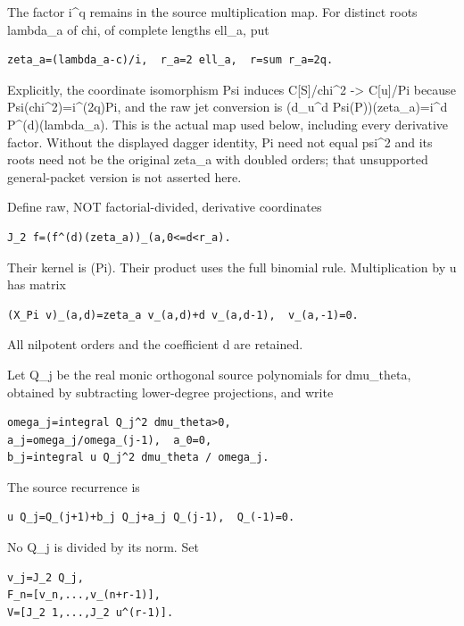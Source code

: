 The factor i\^{}q remains in the source multiplication map. For distinct roots lambda\_a of chi, of complete lengths ell\_a, put

\begin{verbatim}
zeta_a=(lambda_a-c)/i,  r_a=2 ell_a,  r=sum r_a=2q.
\end{verbatim}

Explicitly, the coordinate isomorphism Psi induces C{[}S{]}/chi\^{}2 -\textgreater{} C{[}u{]}/Pi because Psi(chi\^{}2)=i\^{}(2q)Pi, and the raw jet conversion is (d\_u\^{}d Psi(P))(zeta\_a)=i\^{}d P\^{}(d)(lambda\_a). This is the actual map used below, including every derivative factor. Without the displayed dagger identity, Pi need not equal psi\^{}2 and its roots need not be the original zeta\_a with doubled orders; that unsupported general-packet version is not asserted here.

Define raw, NOT factorial-divided, derivative coordinates

\begin{verbatim}
J_2 f=(f^(d)(zeta_a))_(a,0<=d<r_a).
\end{verbatim}

Their kernel is (Pi). Their product uses the full binomial rule. Multiplication by u has matrix

\begin{verbatim}
(X_Pi v)_(a,d)=zeta_a v_(a,d)+d v_(a,d-1),  v_(a,-1)=0.
\end{verbatim}

All nilpotent orders and the coefficient d are retained.

Let Q\_j be the real monic orthogonal source polynomials for dmu\_theta, obtained by subtracting lower-degree projections, and write

\begin{verbatim}
omega_j=integral Q_j^2 dmu_theta>0,
a_j=omega_j/omega_(j-1),  a_0=0,
b_j=integral u Q_j^2 dmu_theta / omega_j.
\end{verbatim}

The source recurrence is

\begin{verbatim}
u Q_j=Q_(j+1)+b_j Q_j+a_j Q_(j-1),  Q_(-1)=0.
\end{verbatim}

No Q\_j is divided by its norm. Set

\begin{verbatim}
v_j=J_2 Q_j,
F_n=[v_n,...,v_(n+r-1)],
V=[J_2 1,...,J_2 u^(r-1)].
\end{verbatim}

